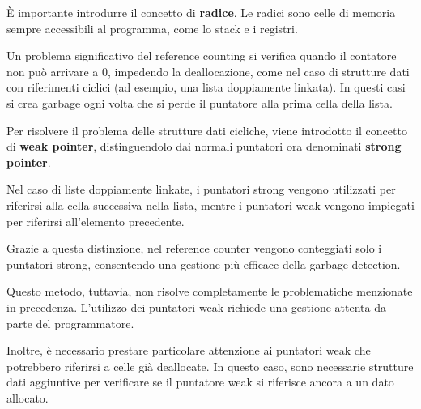 \documentclass{article}
\begin{document}
È importante introdurre il concetto di \textbf{radice}. Le radici sono celle di memoria sempre accessibili al programma, come lo stack e i registri.

Un problema significativo del reference counting si verifica quando il contatore non può arrivare a 0, impedendo la deallocazione, come nel caso di strutture dati con riferimenti ciclici (ad esempio, una lista doppiamente linkata). In questi casi si crea garbage ogni volta che si perde il puntatore alla prima cella della lista.

Per risolvere il problema delle strutture dati cicliche, viene introdotto il concetto di \textbf{weak pointer}, distinguendolo dai normali puntatori ora denominati \textbf{strong pointer}.

Nel caso di liste doppiamente linkate, i puntatori strong vengono utilizzati per riferirsi alla cella successiva nella lista, mentre i puntatori weak vengono impiegati per riferirsi all'elemento precedente.

Grazie a questa distinzione, nel reference counter vengono conteggiati solo i puntatori strong, consentendo una gestione più efficace della garbage detection.

Questo metodo, tuttavia, non risolve completamente le problematiche menzionate in precedenza. L'utilizzo dei puntatori weak richiede una gestione attenta da parte del programmatore. 

Inoltre, è necessario prestare particolare attenzione ai puntatori weak che potrebbero riferirsi a celle già deallocate. In questo caso, sono necessarie strutture dati aggiuntive per verificare se il puntatore weak si riferisce ancora a un dato allocato.
\end{document}
